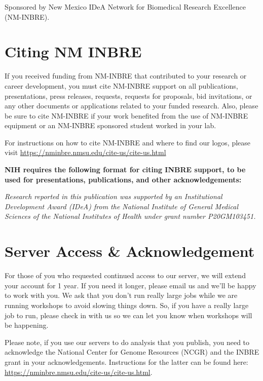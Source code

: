 \documentclass[
]{book}
\begin{document}
Sponsored by New Mexico IDeA Network for Biomedical Research Excellence (NM-INBRE).

\hypertarget{citing-nm-inbre}{%
\chapter*{Citing NM INBRE}\label{citing-nm-inbre}}

If you received funding from NM-INBRE that contributed to your research or career development, you must cite NM-INBRE support on all publications, presentations, press releases, requests, requests for proposals, bid invitations, or any other documents or applications related to your funded research. Also, please be sure to cite NM-INBRE if your work benefited from the use of NM-INBRE equipment or an NM-INBRE sponsored student worked in your lab.

For instructions on how to cite NM-INBRE and where to find our logos, please visit \url{https://nminbre.nmsu.edu/cite-us/cite-us.html}

{\textbf{NIH requires the following format for citing INBRE support, to be used for presentations, publications, and other acknowledgements:}}

{\emph{Research reported in this publication was supported by an Institutional Development Award (IDeA) from the National Institute of General Medical Sciences of the National Institutes of Health under grant number P20GM103451.}}

\hypertarget{server-access-acknowledgement}{%
\chapter*{Server Access \& Acknowledgement}\label{server-access-acknowledgement}}

For those of you who requested continued access to our server, we will extend your account for 1 year. If you need it longer, please email us and we'll be happy to work with you. We ask that you don't run really large jobs while we are running workshops to avoid slowing things down. So, if you have a really large job to run, please check in with us so we can let you know when workshops will be happening.

Please note, if you use our servers to do analysis that you publish, you need to acknowledge the National Center for Genome Resources (NCGR) and the INBRE grant in your acknowledgements. Instructions for the latter can be found here: \url{https://nminbre.nmsu.edu/cite-us/cite-us.html}.
\end{document}
